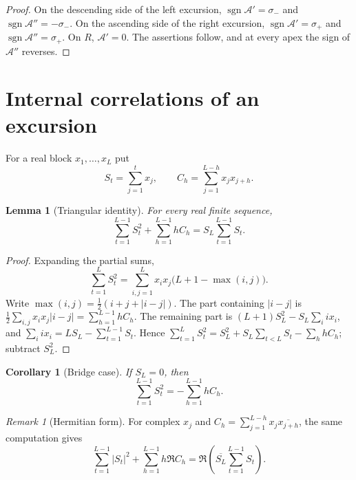 \documentclass[11pt]{amsart}
\numberwithin{equation}{section}
\theoremstyle{plain}
\newtheorem{lemma}[theorem]{Lemma}
\newtheorem{corollary}[theorem]{Corollary}
\theoremstyle{definition}
\theoremstyle{remark}
\newtheorem{remark}[theorem]{Remark}
\DeclareMathOperator{\sgn}{sgn}
\newcommand{\Anet}{\mathcal{A}}
\begin{document}
\begin{proof}
On the descending side of the left excursion,
$\sgn\Anet'=\sigma_-$ and $\sgn\Anet''=-\sigma_-$. On the ascending side of
the right excursion, $\sgn\Anet'=\sigma_+$ and $\sgn\Anet''=\sigma_+$. On
$R$, $\Anet'=0$. The assertions follow, and at every apex the sign of
$\Anet''$ reverses.
\end{proof}

\section{Internal correlations of an excursion}
\label{sec:internal_corr}

For a real block $x_1,\dots,x_L$ put
\begin{equation}
\label{eq:block_def}
S_t=\sum_{j=1}^t x_j,\qquad
C_h=\sum_{j=1}^{L-h}x_jx_{j+h}.
\end{equation}

\begin{lemma}[Triangular identity]
\label{lem:triangular-corr}
For every real finite sequence,
\begin{equation}
\label{eq:general-triangular}
\sum_{t=1}^{L-1}S_t^2+\sum_{h=1}^{L-1}hC_h
=S_L\sum_{t=1}^{L-1}S_t.
\end{equation}
\end{lemma}

\begin{proof}
Expanding the partial sums,
\[
\sum_{t=1}^{L}S_t^2
=\sum_{i,j=1}^{L}x_ix_j\bigl(L+1-\max(i,j)\bigr).
\]
Write $\max(i,j)=\tfrac12(i+j+|i-j|)$. The part containing $|i-j|$ is
$\tfrac12\sum_{i,j}x_ix_j|i-j|=\sum_{h=1}^{L-1}hC_h$. The remaining part is
$(L+1)S_L^2-S_L\sum_i ix_i$, and $\sum_i ix_i=LS_L-\sum_{t=1}^{L-1}S_t$.
Hence
$\sum_{t=1}^{L}S_t^2=S_L^2+S_L\sum_{t<L}S_t-\sum_hhC_h$; subtract $S_L^2$.
\end{proof}

\begin{corollary}[Bridge case]
\label{cor:bridge}
If $S_L=0$, then
\begin{equation}
\label{eq:bridge-triangular}
\sum_{t=1}^{L-1}S_t^2=-\sum_{h=1}^{L-1}hC_h.
\end{equation}
\end{corollary}

\begin{remark}[Hermitian form]
\label{rem:hermitian}
For complex $x_j$ and $C_h=\sum_{j=1}^{L-h}x_j\overline{x_{j+h}}$, the same
computation gives
\[
\sum_{t=1}^{L-1}|S_t|^2+\sum_{h=1}^{L-1}h\Re C_h
=\Re\!\left(\overline{S_L}\sum_{t=1}^{L-1}S_t\right).
\]
\end{remark}
\end{document}
